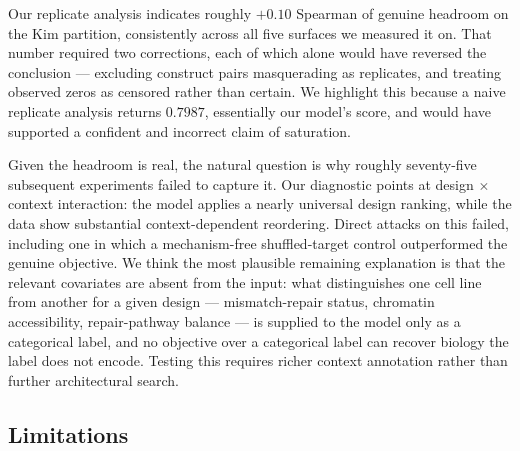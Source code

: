\documentclass[11pt]{article}
\begin{document}
Our replicate analysis indicates roughly $+0.10$ Spearman of genuine headroom on the
Kim partition, consistently across all five surfaces we measured it on. That number required two corrections, each of which alone would have
reversed the conclusion --- excluding construct pairs masquerading as replicates, and
treating observed zeros as censored rather than certain. We highlight this because a
naive replicate analysis returns $0.7987$, essentially our model's score, and would
have supported a confident and incorrect claim of saturation.

Given the headroom is real, the natural question is why roughly seventy-five subsequent
experiments failed to capture it. Our diagnostic points at design $\times$ context
interaction: the model applies a nearly universal design ranking, while the data show
substantial context-dependent reordering. Direct attacks on this failed, including one
in which a mechanism-free shuffled-target control outperformed the genuine objective.
We think the most plausible remaining explanation is that the relevant covariates are
absent from the input: what distinguishes one cell line from another for a given design
--- mismatch-repair status, chromatin accessibility, repair-pathway balance --- is
supplied to the model only as a categorical label, and no objective over a categorical
label can recover biology the label does not encode. Testing this requires richer
context annotation rather than further architectural search.

\subsection{Limitations}
\end{document}
